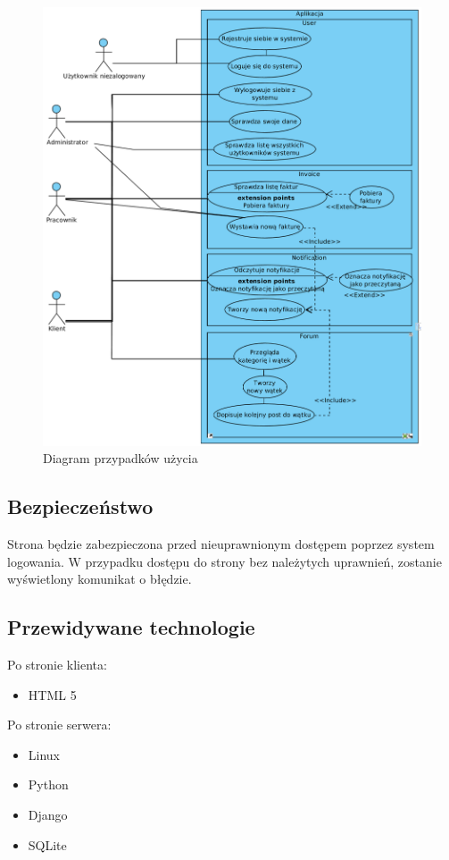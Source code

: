 \documentclass[12pt]{article}
\begin{document}
	\begin{figure}[H]
		\centering
		\includegraphics[scale=0.55]{img/przejscia.png}
		\caption{Diagram przypadków użycia}
		\label{}
	\end{figure}
	\newpage
	
	\subsection{Bezpieczeństwo}
	Strona będzie zabezpieczona przed nieuprawnionym dostępem poprzez system logowania. W przypadku dostępu do strony bez należytych uprawnień, zostanie wyświetlony komunikat o błędzie.
	
	\subsection{Przewidywane technologie}
	Po stronie klienta:
	\begin{itemize}
		\item HTML 5
	\end{itemize}
	Po stronie serwera:
	\begin{itemize}
		\item Linux
		\item Python
		\item Django
		\item SQLite
	\end{itemize}
	
\end{document}
